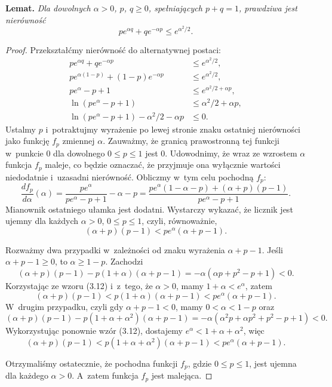 \noindent\textsf{\textbf{Lemat.}} \textit{Dla dowolnych $\alpha>0$, \/$p$, \/$q\ge0$, spełniających\/ $p+q=1$, prawdziwa jest nierówność}
	\[
		pe^{\alpha q}+qe^{-\alpha p} \le e^{\alpha^2\!/2}.
	\]
\begin{proof}
	Przekształćmy nierówność do alternatywnej postaci:
	\begin{align*}
		pe^{\alpha q}+qe^{-\alpha p} &\le e^{\alpha^2\!/2}, \\
		pe^{\alpha(1-p)}+(1-p)e^{-\alpha p} &\le e^{\alpha^2\!/2}, \\
		pe^\alpha-p+1 &\le e^{\alpha^2\!/2+\alpha p}, \\
		\ln(pe^\alpha-p+1) &\le \alpha^2\!/2+\alpha p, \\
		\ln(pe^\alpha-p+1)-\alpha^2\!/2-\alpha p &\le 0.
	\end{align*}
	Ustalmy $p$ i~potraktujmy wyrażenie po lewej stronie znaku ostatniej nierówności jako funkcję $f_p$ zmiennej $\alpha$.
Zauważmy, że granicą prawostronną tej funkcji w~punkcie 0 dla dowolnego $0\le p\le1$ jest 0.
Udowodnimy, że wraz ze wzrostem $\alpha$ funkcja $f_p$ maleje, co będzie oznaczać, że przyjmuje ona wyłącznie wartości niedodatnie i~uzasadni nierówność.
Obliczmy w~tym celu pochodną $f_p$:
	\[
	    \frac{df_p}{d\alpha}(\alpha) = \frac{pe^\alpha}{pe^\alpha-p+1}-\alpha-p = \frac{pe^\alpha(1-\alpha-p)+(\alpha+p)(p-1)}{pe^\alpha-p+1}.
	\]
	Mianownik ostatniego ułamka jest dodatni.
Wystarczy wykazać, że licznik jest ujemny dla każdych $\alpha>0$, $0\le p\le1$, czyli, równoważnie,
	\[
	    (\alpha+p)(p-1) < pe^\alpha(\alpha+p-1).
	\]

	Rozważmy dwa przypadki w~zależności od znaku wyrażenia $\alpha+p-1$.
Jeśli $\alpha+p-1\ge0$, to $\alpha\ge1-p$.
Zachodzi
	\[
	    (\alpha+p)(p-1)-p(1+\alpha)(\alpha+p-1) = -\alpha(\alpha p+p^2-p+1) < 0.
	\]
	Korzystając ze wzoru (3.12) i~z~tego, że $\alpha>0$, mamy $1+\alpha<e^\alpha$, zatem
	\[
	    (\alpha+p)(p-1) < p(1+\alpha)(\alpha+p-1) < pe^\alpha(\alpha+p-1).
	\]
	W~drugim przypadku, czyli gdy $\alpha+p-1<0$, mamy $0<\alpha<1-p$ oraz
	\[
	    (\alpha+p)(p-1)-p(1+\alpha+\alpha^2)(\alpha+p-1) = -\alpha(\alpha^2p+\alpha p^2+p^2-p+1) < 0.
	\]
	Wykorzystując ponownie wzór (3.12), dostajemy $e^\alpha<1+\alpha+\alpha^2$, więc
	\[
		(\alpha+p)(p-1) < p(1+\alpha+\alpha^2)(\alpha+p-1) < pe^\alpha(\alpha+p-1).
	\]

	Otrzymaliśmy ostatecznie, że pochodna funkcji $f_p$, gdzie $0\le p\le1$, jest ujemna dla każdego $\alpha>0$.
A~zatem funkcja $f_p$ jest malejąca.
\end{proof}

